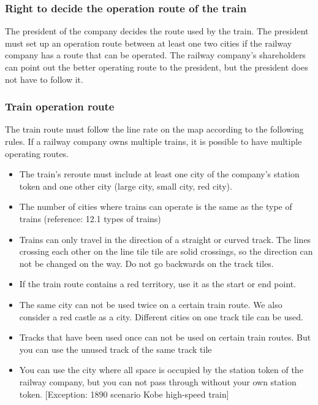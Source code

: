 \documentclass{article}
\begin{document}
\begin{CJK}{UTF8}{min}
\subsubsection{Right to decide the operation route of the train}
The president of the company decides the route used by the train. The
president must set up an operation route between at least one two
cities if the railway company has a route that can be operated. The
railway company's shareholders can point out the better operating
route to the president, but the president does not have to follow it.

\subsubsection{Train operation route}
The train route must follow the line rate on the map according to the
following rules. If a railway company owns multiple trains, it is
possible to have multiple operating routes.
\begin{itemize}
\item The train's reroute must include at least one city of the
  company's station token and one other city (large city, small city,
  red city).

\item The number of cities where trains can operate is the same as the
  type of trains (reference: 12.1 types of trains)

\item Trains can only travel in the direction of a straight or curved
  track. The lines crossing each other on the line tile tile are solid
  crossings, so the direction can not be changed on the way. Do not go
  backwards on the track tiles.

\item If the train route contains a red territory, use it as the start
  or end point.

\item The same city can not be used twice on a certain train route. We
  also consider a red castle as a city. Different cities on one track
  tile can be used.

\item Tracks that have been used once can not be used on certain train
  routes. But you can use the unused track of the same track tile

\item You can use the city where all space is occupied by the station
  token of the railway company, but you can not pass through without
  your own station token. [Exception: 1890 scenario Kobe high-speed
  train]


\end{itemize}
\end{CJK}
\end{document}
